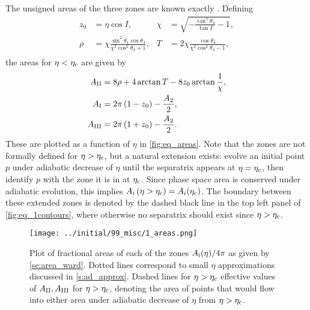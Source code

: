 \documentclass[
        fleqn,
        usenatbib,
        referee,
    ]{mnras}
\newcommand*{\p}[1]{\left(#1\right)}
\begin{document}
The unsigned areas of the three zones are known exactly
\citep{henrard1987,ward2004I}. Defining
\begin{subequations}
    \begin{align}
        z_0 &= \eta\cos I, &
        \chi &= \sqrt{-\frac{\tan^3\theta_4}{\tan I} - 1},\\
        \rho &= \chi \frac{\sin^2 \theta_4\cos \theta_4}{
            \chi^2 \cos^2\theta_4 + 1},&
        T &= 2\chi \frac{\cos \theta_4}{
            \chi^2 \cos^2\theta_4 - 1},\\
    \end{align}
\end{subequations}
the areas for $\eta < \eta_{\rm c}$ are given by
\begin{subequations}\label{se:area_ward}
    \begin{align}
        A_{\rm II} &= 8\rho + 4\arctan T - 8z_0 \arctan \frac{1}{\chi},\\
        A_{\rm I} &= 2\pi\p{1 - z_0} - \frac{A_2}{2},\\
        A_{\rm III} &= 2\pi\p{1 + z_0} - \frac{A_2}{2}.
    \end{align}
\end{subequations}
These are plotted as a function of $\eta$ in \autoref{fig:eq_areas}. Note that
the zones are not formally defined for $\eta > \eta_{\rm c}$, but a natural
extension exists: evolve an initial point $p$ under adiabatic decrease of $\eta$
until the separatrix appears at $\eta = \eta_{\rm c}$, then identify $p$ with
the zone it is in at $\eta_{\rm c}$. Since phase space area is conserved under
adiabatic evolution, this implies $A_i\p{\eta > \eta_{\rm c}} = A_i(\eta_{\rm
c})$. The boundary between these extended zones is denoted by the dashed black
line in the top left panel of \autoref{fig:eq_1contours}, where otherwise no
separatrix should exist since $\eta > \eta_{\rm c}$.
\begin{figure}
    \centering
    \texttt{[image: ../initial/99\_misc/1\_areas.png]}
    \caption{Plot of fractional areas of each of the zones $A_{\rm i}(\eta) /
    4\pi$ as given by \autoref{se:area_ward}. Dotted lines correspond to small
    $\eta$ approximations discussed in \autoref{s:ad_approx}. Dashed lines for
    $\eta > \eta_{\rm c}$ effective values of $A_{\rm II}, A_{\rm III}$ for
    $\eta > \eta_{\rm c}$, denoting the area of points that would flow into
    either area under adiabatic decrease of $\eta$ from $\eta > \eta_{\rm
    c}$.}\label{fig:eq_areas}
\end{figure}
\end{document}
